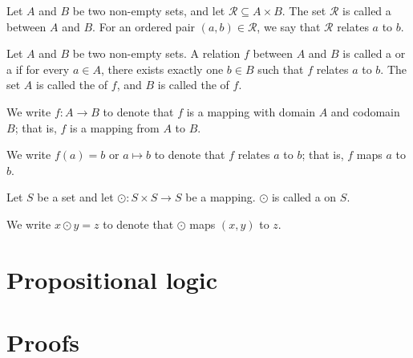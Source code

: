 \begin{defn}
Let $ A $ and $ B $ be two non-empty sets, and let $ \mathcal{R}\subseteq A\times B $. The set $ \mathcal{R} $ is called a  between $ A $ and $ B $. For an ordered pair $ (a,b)\in\mathcal{R} $, we say that $ \mathcal{R} $ relates $ a $ to $ b $.
\end{defn}

\begin{defn}
Let $ A $ and $ B $ be two non-empty sets. A relation $ f $ between $ A $ and $ B $ is called a  or a  if for every $ a\in A $, there exists exactly one $ b\in B $ such that $ f $ relates $ a $ to $ b $. The set $ A $ is called the  of $ f $, and $ B $ is called the  of $ f $.

We write $ f:A\to B $ to denote that $ f $ is a mapping with domain $ A $ and codomain $ B $; that is, $ f $ is a mapping from $ A $ to $ B $.

We write $ f(a)=b $ or $ a\mapsto b $ to denote that $ f $ relates $ a $ to $ b $; that is, $ f $ maps $ a $ to $ b $.
\end{defn}

\begin{defn}\label{defn:binop}
Let $ S $ be a set and let $ \odot:S\times S\to S $ be a mapping. $ \odot $ is called a  on $ S $.

We write $ x\odot y=z $ to denote that $ \odot $ maps $ (x,y) $ to $ z $.
\end{defn}

\section{Propositional logic}

\section{Proofs}